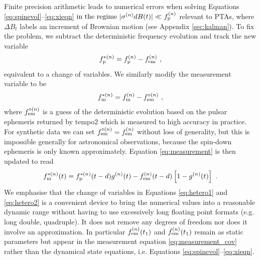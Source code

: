 \documentclass[fleqn,usenatbib,useAMS]{mnras}
\begin{document}
Finite precision arithmetic leads to numerical errors when solving Equations \eqref{eq:spinevol}--\eqref{eq:xieqn} $ \text{in  the regime } |\sigma^{(n)} dB(t) | \ll f_{\rm p}^{(n)}$ relevant to PTAs, where $\Delta B_t$ labels an increment of Brownian motion (see Appendix \ref{sec:kalman}). To fix the problem, we subtract the deterministic frequency evolution and track the new variable
\begin{equation}
	f_{\rm p}^{* (n)} = f_{\rm p}^{(n)} - f_{\rm em}^{(n)} \ , \label{eq:hetero1}
\end{equation}  
equivalent to a change of variables. We similarly modify the measurement variable to be
\begin{equation}
	f_{\rm m}^{* (n)} = f_{\rm m}^{(n)} - f_{\rm em}^{\diamond (n)} \ , \label{eq:hetero2}
\end{equation}
where $ f_{\rm em}^{\diamond (n)}$ is a guess of the deterministic evolution based on the pulsar ephemeris returned by {\sc tempo2}  which is measured to high accuracy in practice. For synthetic data we can set $ f_{\rm em}^{\diamond (n)} = f_{\rm em}^{(n)}$ without loss of generality, but this is impossible generally for astronomical observations, because the spin-down ephemeris is only known approximately. Equation \eqref{eq:measurement} is then updated to read 
\begin{equation}
	f_{\rm m}^{* (n)}(t) = f_{\rm p}^{* (n)}(t-d) g^{(n)}(t) -  f_{\rm em}^{(n)}(t-d)\left[ 1-g^{(n)}(t)\right] \ .
	\label{eq:measurement_cov}
\end{equation}
We emphasise that the change of variables in Equations \eqref{eq:hetero1} and \eqref{eq:hetero2} is a convenient device to bring the numerical values into a reasonable dynamic range without having to use excessively long floating point formats (e.g. long double, quadruple). It does not remove any degrees of freedom nor does it involve an approximation. In particular $f_{\rm em}^{(n)}(t_1)$
and $\dot{f}_{\rm em}^{(n)}(t_1)$ remain as static parameters but appear in the measurement equation \eqref{eq:measurement_cov} rather than the dynamical state equations, i.e. Equations \eqref{eq:spinevol}--\eqref{eq:xieqn}.
\end{document}
